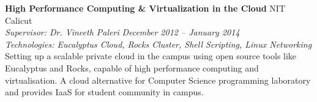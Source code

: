 \documentclass[margin,line]{resume}
\begin{document}
\begin{resume}
    \textbf{High Performance Computing \& Virtualization in the Cloud} 				\hfill NIT Calicut \\
      \textit{Supervisor: Dr. Vineeth Paleri } 			\hfill \textit{December 2012 -- January 2014}\\
      \textit{Technologies: Eucalyptus Cloud, Rocks Cluster, Shell Scripting, Linux Networking}\\
    Setting up a scalable private cloud in the campus using open source tools like Eucalyptus and Rocks,
capable of high performance computing and virtualisation.  A cloud alternative for Computer Science
programming laboratory and provides IaaS for student community in campus.
	\vspace{2mm}%
%
%   
%   
%   
%    
      
      
   

%
%   
%	
%	
%	 




\end{resume}
\end{document}
